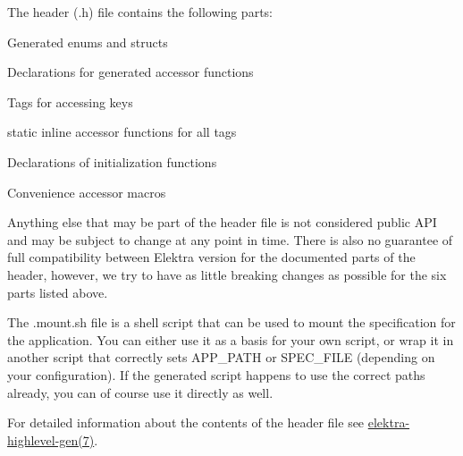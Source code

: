 The header ({\ttfamily .h}) file contains the following parts\+:


\begin{DoxyEnumerate}
\item Generated {\ttfamily enum}s and {\ttfamily struct}s
\item Declarations for generated accessor functions
\item Tags for accessing keys
\item {\ttfamily static inline} accessor functions for all tags
\item Declarations of initialization functions
\item Convenience accessor macros
\end{DoxyEnumerate}

Anything else that may be part of the header file is not considered public A\+PI and may be subject to change at any point in time. There is also no guarantee of full compatibility between Elektra version for the documented parts of the header, however, we try to have as little breaking changes as possible for the six parts listed above.

The {\ttfamily .mount.\+sh} file is a shell script that can be used to mount the specification for the application. You can either use it as a basis for your own script, or wrap it in another script that correctly sets {\ttfamily A\+P\+P\+\_\+\+P\+A\+TH} or {\ttfamily S\+P\+E\+C\+\_\+\+F\+I\+LE} (depending on your configuration). If the generated script happens to use the correct paths already, you can of course use it directly as well.

For detailed information about the contents of the header file see \hyperlink{doc_help_elektra-highlevel-gen_md}{elektra-\/highlevel-\/gen(7)}.


